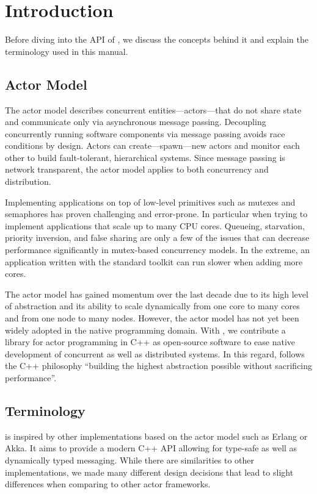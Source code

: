 \section{Introduction}

Before diving into the API of \lib, we discuss the concepts behind it and explain the terminology used in this manual.

\subsection{Actor Model}

The actor model describes concurrent entities---actors---that do not share state and communicate only via asynchronous message passing.
Decoupling concurrently running software components via message passing avoids race conditions by design.
Actors can create---spawn---new actors and monitor each other to build fault-tolerant, hierarchical systems.
Since message passing is network transparent, the actor model applies to both concurrency and distribution.

Implementing applications on top of low-level primitives such as mutexes and semaphores has proven challenging and error-prone.
In particular when trying to implement applications that scale up to many CPU cores.
Queueing, starvation, priority inversion, and false sharing are only a few of the issues that can decrease performance significantly in mutex-based concurrency models.
In the extreme, an application written with the standard toolkit can run slower when adding more cores.

The actor model has gained momentum over the last decade due to its high level of abstraction and its ability to scale dynamically from one core to many cores and from one node to many nodes.
However, the actor model has not yet been widely adopted in the native programming domain.
With \lib, we contribute a library for actor programming in C++ as open-source software to ease native development of concurrent as well as distributed systems.
In this regard, \lib follows the C++ philosophy ``building the highest abstraction possible without sacrificing performance''.

\subsection{Terminology}

\lib is inspired by other implementations based on the actor model such as Erlang or Akka. It aims to provide a modern C++ API allowing for type-safe as well as dynamically typed messaging.
While there are similarities to other implementations, we made many different design decisions that lead to slight differences when comparing \lib to other actor frameworks.

